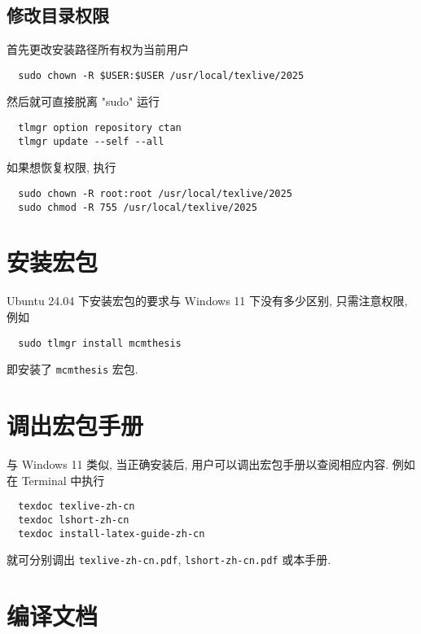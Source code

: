 \subsection{修改目录权限}

首先更改安装路径所有权为当前用户
\begin{lstlisting}
  sudo chown -R $USER:$USER /usr/local/texlive/2025
\end{lstlisting}
然后就可直接脱离 "sudo" 运行
\begin{lstlisting}
  tlmgr option repository ctan
  tlmgr update --self --all
\end{lstlisting}
如果想恢复权限,
执行
\begin{lstlisting}
  sudo chown -R root:root /usr/local/texlive/2025
  sudo chmod -R 755 /usr/local/texlive/2025
\end{lstlisting}

\section{安装宏包}\label{sec:ubuntu:installpackage}

Ubuntu 24.04 下安装宏包的要求与 Windows 11 下没有多少区别, 只需注意权限, 例如
\begin{lstlisting}
  sudo tlmgr install mcmthesis
\end{lstlisting}
即安装了 \texttt{mcmthesis} 宏包.

\section{调出宏包手册}\label{sec:ubuntu:texdoc}

与 Windows 11 类似,
当正确安装后,
用户可以调出宏包手册以查阅相应内容.
例如在 \textsf{Terminal} 中执行
\begin{lstlisting}
  texdoc texlive-zh-cn
  texdoc lshort-zh-cn
  texdoc install-latex-guide-zh-cn
\end{lstlisting}
就可分别调出 \texttt{texlive-zh-cn.pdf},
\texttt{lshort-zh-cn.pdf}
或本手册.

\section{编译文档}

